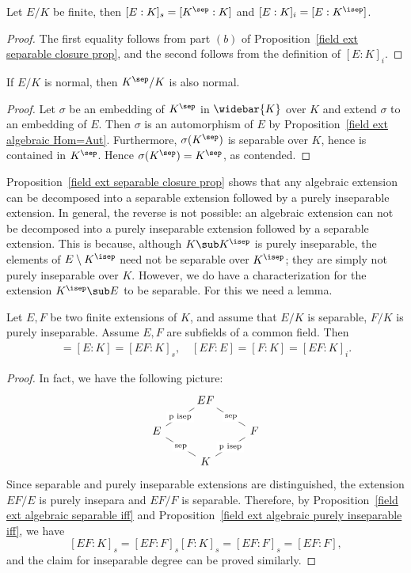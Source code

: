 \begin{corollary}\label{field ext separable closure separable degree}
Let $E/K$ be finite, then $[E:K]_s=[K^{\sep}:K]$ and $[E:K]_i=[E:K^{\isep}]$.
\end{corollary}
\begin{proof}
The first equality follows from part $(b)$ of Proposition~\ref{field ext separable closure prop}, and the second follows from the definition of $[E:K]_i$.
\end{proof}
\begin{corollary}\label{field normal ext separable closure is normal}
If $E/K$ is normal, then $K^{\sep}/K$ is also normal.
\end{corollary}
\begin{proof}
Let $\sigma$ be an embedding of $K^{\sep}$ in $\widebar{K}$ over $K$ and extend $\sigma$ to an embedding of $E$. Then $\sigma$ is an automorphism of $E$ by Proposition~\ref{field ext algebraic Hom=Aut}. Furthermore, $\sigma(K^{\sep})$ is separable over $K$, hence is contained in $K^{\sep}$. Hence $\sigma(K^{\sep})=K^{\sep}$, as contended.
\end{proof}
Proposition~\ref{field ext separable closure prop} shows that any algebraic extension can be decomposed into a separable extension followed by a purely inseparable extension. In general, the reverse is not possible: an algebraic extension can not be decomposed into a purely inseparable extension followed by a separable extension. This is because, although $K\sub K^{\isep}$ is purely inseparable, the elements of $E\setminus K^{\isep}$ need not be separable over $K^{\isep}$; they are simply not purely inseparable over $K$. However, we do have a characterization for the extension $K^{\isep}\sub E$ to be separable. For this we need a lemma.
\begin{lemma}\label{field ext composition of sep and p isep}
Let $E,F$ be two finite extensions of $K$, and assume that $E/K$ is separable, $F/K$ is purely inseparable. Assume $E,F$ are subfields of a common field. Then
\begin{align*}
[EF:F]=[E:K]=[EF:K]_s,\quad [EF:E]=[F:K]=[EF:K]_i.
\end{align*}
\end{lemma}
\begin{proof}
In fact, we have the following picture:
\[\begin{tikzcd}[row sep=scriptsize]
&EF&\\
E\ar[ru,no head,"\text{p isep}"description]&&F\ar[lu,swap,no head,"\text{sep}"description]\\
&K\ar[ru,swap,no head,"\text{p isep}"description]\ar[lu,no head,"\text{sep}"description]&
\end{tikzcd}\]
Since separable and purely inseparable extensions are distinguished, the extension $EF/E$ is purely insepara and $EF/F$ is separable. Therefore, by Proposition~\ref{field ext algebraic separable iff} and Proposition~\ref{field ext algebraic purely inseparable iff}, we have
\[[EF:K]_s=[EF:F]_s[F:K]_s=[EF:F]_s=[EF:F],\]
and the claim for inseparable degree can be proved similarly.
\end{proof}
